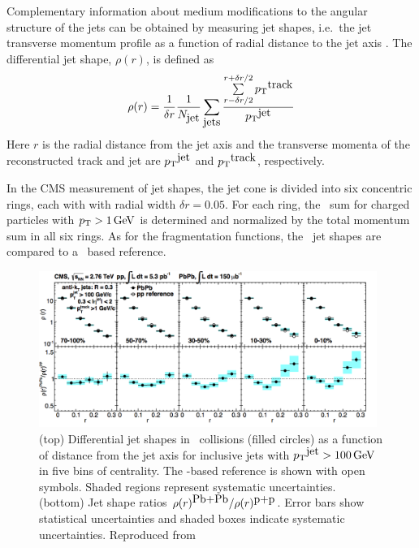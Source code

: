 Complementary information about medium modifications to the angular structure of the jets 
can be obtained by measuring jet shapes, i.e.\ the
jet transverse momentum profile as a function of radial distance to the jet axis
\cite{MehtarTani:2010ma,Idilbi:2008vm,CasalderreySolana:2011rz,
CasalderreySolana:2011rq,Neufeld:2011yh,Blaizot:2012fh,Fickinger:2013xwa}.
The differential jet shape, $\rho(r)$, is defined as
\begin{equation}
\rho(r) = \frac{1}{\delta r} \frac{1}{N_{\mbox{jet}}} \sum_{\mbox{jets}}
\frac{\sum\limits_{{r - \delta r/2}}^{{r + \delta r/2}}{\mbox{$p_{\mathrm{T}}$}^{\mbox{track}}}}{\mbox{$p_{\mathrm{T}}$}^{\mbox{jet}}}
\label{eq:rho(r)}
\end{equation}
Here $r$ is the radial distance from the jet axis
and the transverse momenta of the reconstructed track and jet are
$\mbox{$p_{\mathrm{T}}$}^{\mbox{jet}}$ and $\mbox{$p_{\mathrm{T}}$}^{\mbox{track}}$, respectively.

In the CMS measurement of jet shapes\cite{Chatrchyan:2013kwa}, the jet cone is divided 
into six concentric rings, each with with radial width $\delta r = 0.05$. For each
ring, the \pT\ sum for charged particles with $\mbox{$p_{\mathrm{T}}$} > 1\,\mathrm{GeV}$ is determined and
normalized by the total momentum sum in all six rings. As for the fragmentation
functions, the \PbPb\ jet shapes are compared to a \pp\ based reference.

\begin{figure}[!ht]
\begin{center}
\includegraphics[width=0.98\textwidth]{jetfigures/JetShapes_GR.png}
\caption{\label{fig:JSRatio}
(top) Differential jet shapes in \PbPb\ collisions (filled circles)
as a function of distance from the jet axis for inclusive jets with $\mbox{$p_{\mathrm{T}}$}^{\mbox{jet}} >100\,\mathrm{GeV}$
in five bins of centrality.  The \pp-based reference is shown with open symbols.
Shaded regions represent systematic uncertainties.
(bottom) Jet shape ratios $\rho(r)^{\mbox{Pb+Pb}}/\rho(r)^{\mbox{p+p}}$.
Error bars show statistical uncertainties and shaded boxes indicate systematic uncertainties. 
Reproduced from~\cite{Chatrchyan:2013kwa}}
\label{fig:GR:CMS_jetshapes}
\end{center}
\end{figure}

